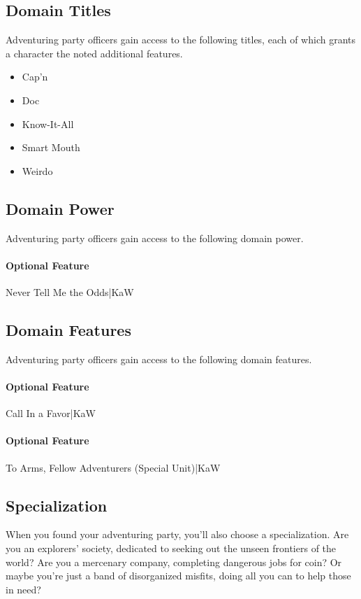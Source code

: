 \documentclass[10pt,a4paper,twoside,bg=print,twocolumn,openany,nodeprecatedcode]{dndbook}
\begin{document}
\subsection{Domain Titles}
Adventuring party officers gain access to the following titles, each of which grants a character the noted additional features.


\begin{itemize}
\item Cap'n
\item Doc
\item Know-It-All
\item Smart Mouth
\item Weirdo
\end{itemize}

\subsection{Domain Power}
Adventuring party officers gain access to the following domain power.

\paragraph{Optional Feature}
Never Tell Me the Odds|KaW

\subsection{Domain Features}
Adventuring party officers gain access to the following domain features.

\paragraph{Optional Feature}
Call In a Favor|KaW

\paragraph{Optional Feature}
To Arms, Fellow Adventurers (Special Unit)|KaW

\subsection{Specialization}
When you found your adventuring party, you'll also choose a specialization. Are you an explorers' society, dedicated to seeking out the unseen frontiers of the world? Are you a mercenary company, completing dangerous jobs for coin? Or maybe you're just a band of disorganized misfits, doing all you can to help those in need?
\end{document}
